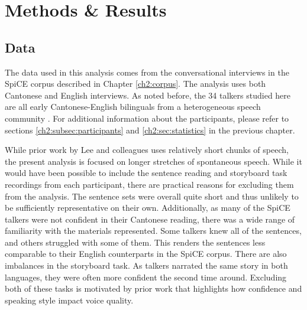 \section{Methods \& Results}\label{ch3:sec:methods_results}

\subsection{Data}\label{ch3:sec:data}

The data used in this analysis comes from the conversational interviews in the SpiCE corpus described in Chapter \ref{ch2:corpus}. The analysis uses both Cantonese and English interviews. As noted before, the 34 talkers studied here are all early Cantonese-English bilinguals from a heterogeneous speech community \citep{liang_2015_china}. For additional information about the participants, please refer to sections \ref{ch2:subsec:participants} and \ref{ch2:sec:statistics} in the previous chapter. 

While prior work by Lee and colleagues \citep[e.g.,][]{lee_2019_acoustic} uses relatively short chunks of speech, the present analysis is focused on longer stretches of spontaneous speech. While it would have been possible to include the sentence reading and storyboard task recordings from each participant, there are practical reasons for excluding them from the analysis. The sentence sets were overall quite short and thus unlikely to be sufficiently representative on their own. Additionally, as many of the SpiCE talkers were not confident in their Cantonese reading, there was a wide range of familiarity with the materials represented. Some talkers knew all of the sentences, and others struggled with some of them. This renders the sentences less comparable to their English counterparts in the SpiCE corpus. There are also imbalances in the storyboard task. As talkers narrated the same story in both languages, they were often more confident the second time around. Excluding both of these tasks is motivated by prior work that highlights how confidence \citep{jarvinen_2013_speaking} and speaking style \citep{lee_2017_bilingual} impact voice quality. 


